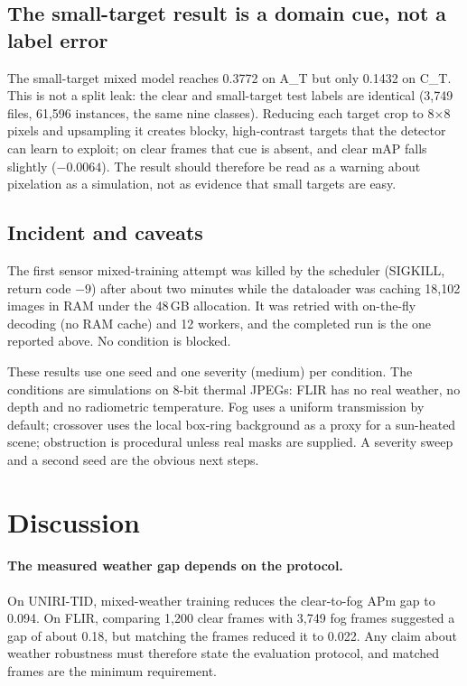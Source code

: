 \documentclass[11pt,a4paper]{article}
\begin{document}
\subsection{The small-target result is a domain cue, not a label error}
The small-target mixed model reaches 0.3772 on A\_T but only 0.1432 on C\_T.
This is not a split leak: the clear and small-target test labels are identical
(3,749 files, 61,596 instances, the same nine classes). Reducing each target
crop to 8$\times$8 pixels and upsampling it creates blocky, high-contrast
targets that the detector can learn to exploit; on clear frames that cue is
absent, and clear mAP falls slightly ($-0.0064$). The result should therefore
be read as a warning about pixelation as a simulation, not as evidence that
small targets are easy.

\subsection{Incident and caveats}
The first sensor mixed-training attempt was killed by the scheduler
(SIGKILL, return code $-9$) after about two minutes while the dataloader was
caching 18,102 images in RAM under the 48\,GB allocation. It was retried with
on-the-fly decoding (no RAM cache) and 12 workers, and the completed run is the
one reported above. No condition is blocked.

These results use one seed and one severity (medium) per condition. The
conditions are simulations on 8-bit thermal JPEGs: FLIR has no real weather, no
depth and no radiometric temperature. Fog uses a uniform transmission by
default; crossover uses the local box-ring background as a proxy for a
sun-heated scene; obstruction is procedural unless real masks are supplied. A
severity sweep and a second seed are the obvious next steps.


\section{Discussion}
\label{sec:discussion}

\paragraph{The measured weather gap depends on the protocol.}
On UNIRI-TID, mixed-weather training reduces the clear-to-fog APm gap to 0.094.
On FLIR, comparing 1,200 clear frames with 3,749 fog frames suggested a gap of
about 0.18, but matching the frames reduced it to 0.022. Any claim about weather
robustness must therefore state the evaluation protocol, and matched frames are
the minimum requirement.
\end{document}
